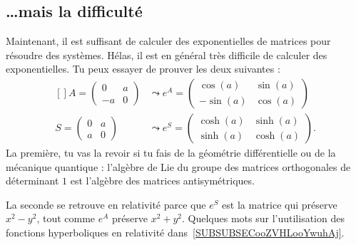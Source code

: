 \subsection{\ldots mais la difficulté}

Maintenant, il est suffisant de calculer des exponentielles de matrices pour résoudre des systèmes. Hélas, il est en général très difficile de calculer des exponentielles. Tu peux essayer de prouver les deux suivantes :
\begin{equation}
	\begin{aligned}[]
		A=\begin{pmatrix}
			  0  & a \\
			  -a & 0
		  \end{pmatrix} & \leadsto  e^{A}=\begin{pmatrix}
			                                  \cos(a)  & \sin(a) \\
			                                  -\sin(a) & \cos(a)
		                                  \end{pmatrix}  \\
		S=\begin{pmatrix}
			  0 & a \\
			  a & 0
		  \end{pmatrix} & \leadsto  e^{S}=\begin{pmatrix}
			                                  \cosh(a) & \sinh(a) \\
			                                  \sinh(a) & \cosh(a)
		                                  \end{pmatrix}.
	\end{aligned}
\end{equation}
La première, tu vas la revoir si tu fais de la géométrie différentielle ou de la mécanique quantique : l'algèbre de Lie du groupe des matrices orthogonales de déterminant \( 1\) est l'algèbre des matrices antisymétriques.

La seconde se retrouve en relativité parce que \( e^S\) est la matrice qui préserve \( x^2-y^2\), tout comme \( e^A\) préserve \( x^2+y^2\). Quelques mots sur l'uutilisation des fonctions hyperboliques en relativité dans~\ref{SUBSUBSECooZVHLooYwuhAj}.

